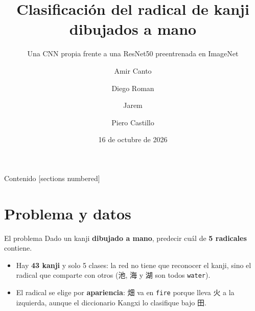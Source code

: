 \documentclass[aspectratio=169,11pt]{beamer}
\title{Clasificación del radical de kanji dibujados a mano}
\subtitle{Una CNN propia frente a una ResNet50 preentrenada en ImageNet}
\author{Amir Canto \and Diego Roman \and Jarem \and Piero Castillo}
\institute{Computación Gráfica · Práctica Calificada 2 \\ Universidad Nacional de Ingeniería}
\date{16 de octubre de 2026}
\newcommand{\jp}[1]{{\cjkfont #1}}
\begin{document}
\maketitle

\begin{frame}{Contenido}
  [sections numbered]
  \tableofcontents
\end{frame}

\section{Problema y datos}

\begin{frame}{El problema}
  Dado un kanji \textbf{dibujado a mano}, predecir cuál de \textbf{5 radicales} contiene.

  \bigskip
  \begin{center}
  \end{center}

  \bigskip
  \begin{itemize}
    \item Hay \textbf{43 kanji} y solo 5 clases: la red no tiene que reconocer el kanji, sino el radical que comparte con otros (\jp{池}, \jp{海} y \jp{湖} son todos \texttt{water}).
    \item El radical se elige por \textbf{apariencia}: \jp{畑} va en \texttt{fire} porque lleva \jp{火} a la izquierda, aunque el diccionario Kangxi lo clasifique bajo \jp{田}.
  \end{itemize}
\end{frame}
\end{document}
